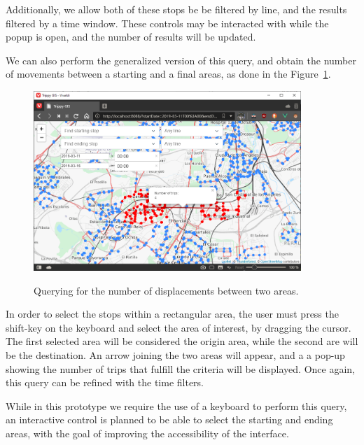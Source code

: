 	Additionally, we allow both of these stops be be filtered by line, and the results filtered by a time window. These controls may be interacted with while the popup is open, and the number of results will be updated.
	
	We can also perform the generalized version of this query, and obtain the number of movements between a starting and a final areas, as done in the Figure~\ref{fig:ui:xyarea}.
	
	\begin{figure}[ht]
		\begin{center}
			{\includegraphics[width=0.9\textwidth]{screens/xy_area.png}}
		\end{center}
		\caption{Querying for the number of displacements between two areas.}
		\label{fig:ui:xyarea}
	\end{figure}
	
	In order to select the stops within a rectangular area, the user must press the  {\sc shift-key} on the keyboard and select the area of interest, by dragging the cursor. The first selected area will be considered the origin area, while the second are will be the destination. An arrow joining the two areas will appear, and a a pop-up showing the number of trips that fulfill the criteria will be displayed. Once again, this query can be refined with the time filters.
	
	While in this prototype we require the use of a keyboard to perform this query, an interactive control is planned to be able to select the starting and ending areas, with the goal of improving the accessibility of the interface.
	